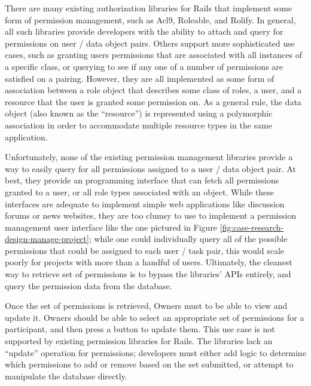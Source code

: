 \documentclass[document.tex]{subfiles}
\begin{document}
There are many existing authorization libraries for Rails that implement some form of permission management, such as Acl9, Roleable, and Rolify.
In general, all such libraries provide developers with the ability to attach and query for permissions on user / data object pairs. Others support more sophisticated use cases, such as granting users permissions that are associated with all instances of a specific class, or querying to see if any one of a number of permissions are satisfied on a pairing. However, they are all implemented as some form of association between a role object that describes some class of roles, a user, and a resource that the user is granted some permission on. As a general rule, the data object (also known as the ``resource'') is represented using a polymorphic association in order to accommodate multiple resource types in the same application.

Unfortunately, none of the existing permission management libraries provide a way to easily query for all permissions assigned to a user / data object pair.
At best, they provide an programming interface that can fetch all permissions granted to a user, or all role types associated with an object.
While these interfaces are adequate to implement simple web applications like discussion forums or news websites, they are too clumsy to use to implement a permission management user interface like the one pictured in Figure \ref{fig:case-research-design-manage-project};
while one could individually query all of the possible permissions that could be assigned to each user / task pair, this would scale poorly for projects with more than a handful of users. Ultimately, the cleanest way to retrieve set of permissions is to bypass the libraries' APIs entirely, and query the permission data from the database.

Once the set of permissions is retrieved, Owners must to be able to view and update it.
Owners should be able to select an appropriate set of permissions for a participant, and then press a button to update them.
This use case is not supported by existing permission libraries for Rails.
The libraries lack an ``update'' operation for permissions; developers must either add logic to determine which permissions to add or remove based on the set submitted, or attempt to manipulate the database directly.
\end{document}
